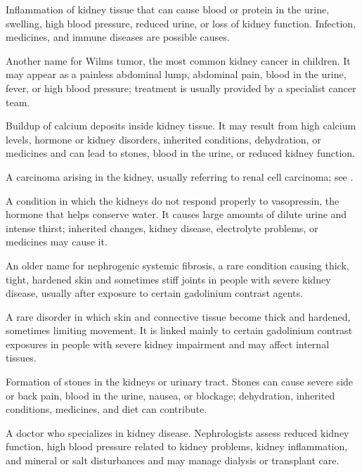  Inflammation of kidney tissue that can cause blood or protein in the urine, swelling, high blood pressure, reduced urine, or loss of kidney function. Infection, medicines, and immune diseases are possible causes.

 Another name for Wilms tumor, the most common kidney cancer in children. It may appear as a painless abdominal lump, abdominal pain, blood in the urine, fever, or high blood pressure; treatment is usually provided by a specialist cancer team.

 Buildup of calcium deposits inside kidney tissue. It may result from high calcium levels, hormone or kidney disorders, inherited conditions, dehydration, or medicines and can lead to stones, blood in the urine, or reduced kidney function.

 A carcinoma arising in the kidney, usually referring to renal cell carcinoma; see .

 A condition in which the kidneys do not respond properly to vasopressin, the hormone that helps conserve water. It causes large amounts of dilute urine and intense thirst; inherited changes, kidney disease, electrolyte problems, or medicines may cause it.

 An older name for nephrogenic systemic fibrosis, a rare condition causing thick, tight, hardened skin and sometimes stiff joints in people with severe kidney disease, usually after exposure to certain gadolinium contrast agents.

 A rare disorder in which skin and connective tissue become thick and hardened, sometimes limiting movement. It is linked mainly to certain gadolinium contrast exposures in people with severe kidney impairment and may affect internal tissues.

 Formation of stones in the kidneys or urinary tract. Stones can cause severe side or back pain, blood in the urine, nausea, or blockage; dehydration, inherited conditions, medicines, and diet can contribute.

 A doctor who specializes in kidney disease. Nephrologists assess reduced kidney function, high blood pressure related to kidney problems, kidney inflammation, and mineral or salt disturbances and may manage dialysis or transplant care.

